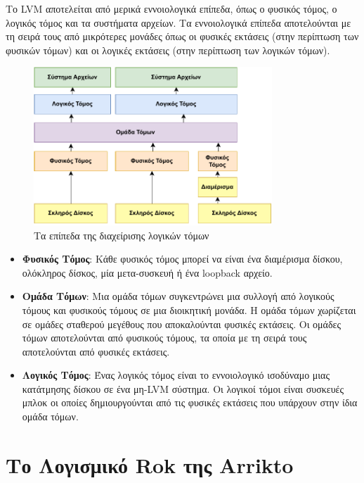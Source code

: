 Το LVM αποτελείται από μερικά εννοιολογικά επίπεδα, όπως ο φυσικός τόμος, ο
λογικός τόμος και τα συστήματα αρχείων. Τα εννοιολογικά επίπεδα αποτελούνται με
τη σειρά τους από μικρότερες μονάδες όπως οι φυσικές εκτάσεις (στην περίπτωση
των φυσικών τόμων) και οι λογικές εκτάσεις (στην περίπτωση των λογικών τόμων).
\\
\begin{figure}[ht]
      \centering
      \includegraphics[width=0.8\textwidth]{resources/lvm-gr.pdf}
      \caption{Τα επίπεδα της διαχείρισης λογικών τόμων}
\end{figure}

\begin{itemize}
      \item \textbf{Φυσικός Τόμος}: Κάθε φυσικός τόμος μπορεί να είναι ένα
            διαμέρισμα δίσκου, ολόκληρος δίσκος, μία μετα-συσκευή ή ένα loopback
            αρχείο.
      \item \textbf{Ομάδα Τόμων}: Μια ομάδα τόμων συγκεντρώνει μια συλλογή από
            λογικούς τόμους και φυσικούς τόμους σε μια διοικητική μονάδα. Η
            ομάδα τόμων χωρίζεται σε ομάδες σταθερού μεγέθους που αποκαλούνται
            φυσικές εκτάσεις. Οι ομάδες τόμων αποτελούνται από φυσικούς τόμους,
            τα οποία με τη σειρά τους αποτελούνται από φυσικές εκτάσεις.
      \item \textbf{Λογικός Τόμος}: Ένας λογικός τόμος είναι το εννοιολογικό
            ισοδύναμο μιας κατάτμησης δίσκου σε ένα μη-LVM σύστημα. Οι λογικοί
            τόμοι είναι συσκευές μπλοκ οι οποίες δημιουργούνται από τις φυσικές
            εκτάσεις που υπάρχουν στην ίδια ομάδα τόμων.
\end{itemize}

\section{Το Λογισμικό Rok της Arrikto}

